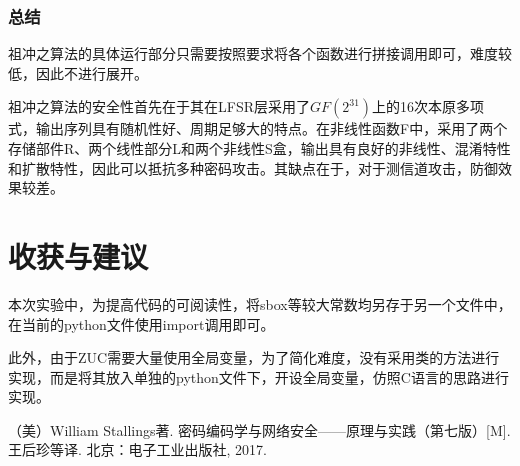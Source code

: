 \documentclass[a4paper, zihao=-4, UTF-8]{ctexart}
\begin{document}
				\subsubsection{总结}
					祖冲之算法的具体运行部分只需要按照要求将各个函数进行拼接调用即可，难度较低，因此不进行展开。
					
					祖冲之算法的安全性首先在于其在LFSR层采用了$GF(2^{31})$上的16次本原多项式，输出序列具有随机性好、周期足够大的特点。在非线性函数F中，采用了两个存储部件R、两个线性部分L和两个非线性S盒，输出具有良好的非线性、混淆特性和扩散特性，因此可以抵抗多种密码攻击。其缺点在于，对于测信道攻击，防御效果较差。
		\section{收获与建议}
			本次实验中，为提高代码的可阅读性，将sbox等较大常数均另存于另一个文件中，在当前的python文件使用import调用即可。
			
			此外，由于ZUC需要大量使用全局变量，为了简化难度，没有采用类的方法进行实现，而是将其放入单独的python文件下，开设全局变量，仿照C语言的思路进行实现。
		\begin{thebibliography}{99}
			（美）William Stallings著. 密码编码学与网络安全——原理与实践（第七版）[M]. 王后珍等译. 北京：电子工业出版社, 2017.
		\end{thebibliography}
		\newpage
		\appendix
\end{document}
